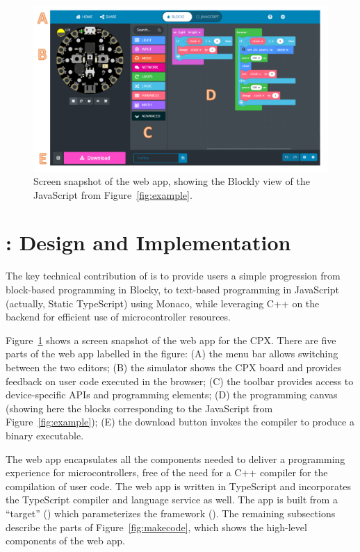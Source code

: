 
\begin{figure}[t]
    \includegraphics[width=6in]{CPXfig.pdf}
\caption{\label{fig:screenSnap}Screen snapshot of the \MC web app, showing the Blockly
view of the JavaScript from Figure~\ref{fig:example}.}
\end{figure}


\section{\MCN: Design and Implementation}
\label{sec:makecode}

The key technical contribution of \MC is to provide users a simple progression from block-based
programming in Blocky, to text-based programming in JavaScript (actually, Static TypeScript) 
using Monaco, while leveraging C++ on the backend for efficient use of microcontroller resources.

Figure~\ref{fig:screenSnap} shows a screen snapshot of the \MC web app for the CPX.
There are five parts of the web app labelled in the figure:
(A) the menu bar allows switching between the two editors;
(B) the simulator shows the CPX board and provides feedback on user code executed in the browser;
(C) the toolbar provides access to device-specific APIs and programming elements;
(D) the programming canvas (showing here the blocks corresponding to the JavaScript from Figure~\ref{fig:example});
(E) the download button invokes the compiler to produce a binary executable.

The \MC web app encapsulates all the components needed to deliver a programming experience 
for microcontrollers, free of the need for a C++ compiler for the compilation of user code.
The web app is written in TypeScript and incorporates the TypeScript compiler and 
language service as well. 
The app is built from a \MC ``target'' (\emph{})
which parameterizes the \MC framework (\emph{}).
The remaining subsections describe the parts of Figure~\ref{fig:makecode}, 
which shows the high-level components of the web app.

